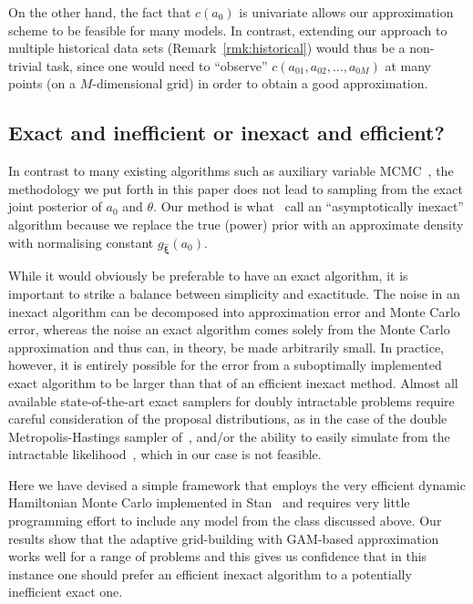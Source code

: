 \documentclass[a4paper, notitlepage, 11pt]{article}
\begin{document}
On the other hand, the fact that $c(a_0)$ is univariate allows our approximation scheme to be feasible for many models. 
In contrast, extending our approach to multiple historical data sets (Remark~\ref{rmk:historical}) would thus be a non-trivial task, since one would need to ``observe'' $c(a_{01}, a_{02}, \ldots, a_{0M})$ at many points (on a $M$-dimensional grid) in order to obtain a good approximation.

\subsection{Exact and inefficient or inexact and efficient?}

In contrast to many existing algorithms such as auxiliary variable MCMC~\citep{Moller2006}, the methodology we put forth in this paper does not lead to sampling from the exact joint posterior of $a_0$ and $\theta$.
Our method is what~\cite{Park2018} call an ``asymptotically inexact'' algorithm because we replace the true (power) prior with an approximate density with normalising constant $g_{\boldsymbol{\hat{\xi}}}(a_0)$.

While it would obviously be preferable to have an exact algorithm, it is important to strike a balance between simplicity and exactitude.
The noise in an inexact algorithm can be decomposed into approximation error and Monte Carlo error, whereas the noise an exact algorithm comes solely from the Monte Carlo approximation and thus can, in theory, be made arbitrarily small.
In practice, however, it is entirely possible for the error from a suboptimally implemented exact algorithm to be larger than that of an efficient inexact method.
Almost all available state-of-the-art exact samplers for doubly intractable problems require careful consideration of the proposal distributions, as in the case of the double Metropolis-Hastings sampler of~\cite{Liang2010}, and/or the ability to easily simulate from the intractable likelihood~\citep{Murray2012,Park2018,Stoehr2019}, which in our case is not feasible.

Here we have devised a simple framework that employs the very efficient dynamic Hamiltonian Monte Carlo implemented in Stan~\citep{Carpenter2017} and requires very little programming effort to include any model from the class discussed above.
Our results show that the adaptive grid-building with GAM-based approximation works well for a range of problems and this gives us confidence that in this instance one should prefer an efficient inexact algorithm to a potentially inefficient exact one.
\end{document}
